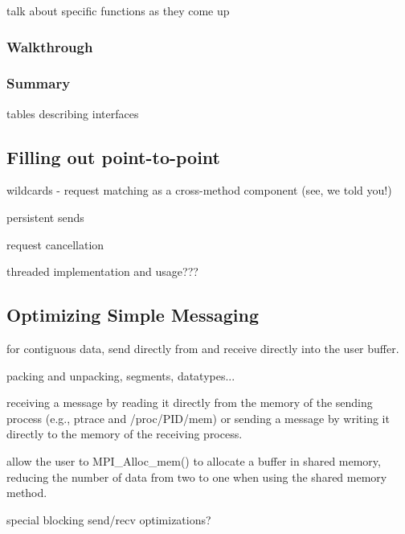 talk about specific functions as they come up

\subsubsection{Walkthrough}
\label{sssec:walkthrough}


\subsubsection{Summary}

tables describing interfaces


\subsection{Filling out point-to-point}

wildcards
- request matching as a cross-method component (see, we told you!)

persistent sends

request cancellation

threaded implementation and usage???


\subsection{Optimizing Simple Messaging}


for contiguous data, send directly from and receive directly into the
user buffer.

packing and unpacking, segments, datatypes...

receiving a message by reading it directly from the memory of the
sending process (e.g., ptrace and /proc/PID/mem) or sending a message
by writing it directly to the memory of the receiving process.

allow the user to MPI_Alloc_mem() to allocate a buffer in shared
memory, reducing the number of data from two to one when using the
shared memory method.

special blocking send/recv optimizations?


